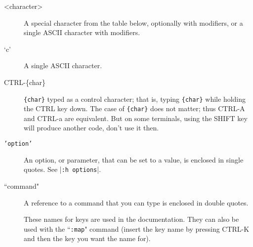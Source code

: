 \begin{description}
				\item[<character>]
								\label{<character>}
								A special character from the table below, optionally with modifiers, or a single ASCII character with modifiers.

				\item[`c']
								\label{'character'}
								A single ASCII character.

				\item[CTRL-\{char\}]
								\label{CTRL-{char}}
								\texttt{\{char\}} typed as a control character; that is, typing \texttt{\{char\}} while holding the CTRL key down.
								The case of \texttt{\{char\}} does not matter; thus CTRL-A and CTRL-a are equivalent.
								But on some terminals, using the SHIFT key will produce another code, don't use it then.

				\item[\texttt{'option'}]
								\label{'option'}
								An option, or parameter, that can be set to a value, is enclosed in single quotes.
								See |\texttt{:h options}|.

				\item[``command"]
								\label{quotecommandquote}
								A reference to a command that you can type is enclosed in double quotes.

				\item[]
								\label{key-notation}
								\label{key-codes}
								\label{keycodes}
These names for keys are used in the documentation.
They can also be used with the ``\texttt{:map}" command (insert the key name by pressing CTRL-K and then the key you want the name for).

\begin{center}\begin{tabularx}{\textwidth}{|l|X|l|l|} %
	

\end{tabularx}
\end{center}
\end{description}
